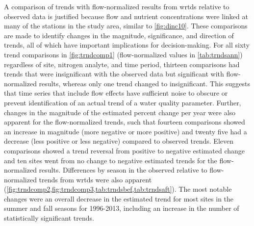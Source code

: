 \documentclass[journal = esthag, manuscript = article]{achemso}\usepackage[]{graphicx}\usepackage[]{color}
\begin{document}
A comparison of trends with flow-normalized results from \ac{wrtds} relative to observed data is justified because flow and nutrient concentrations were linked at many of the stations in the study area, similar to \cref{fig:dinc10}.  These comparisons are made to identify changes in the magnitude, significance, and direction of trends, all of which have important implications for decision-making. For all sixty trend comparisons in \cref{fig:trndcomp1} (flow-normalized values in \cref{tab:trndsann}) regardless of site, nitrogen analyte, and time period, thirteen comparisons had trends that were insignificant with the observed data but significant with flow-normalized results, whereas only one trend changed to insignificant. This suggests that time series that include flow effects have sufficient noise to obscure or prevent identification of an actual trend of a water quality parameter. Further, changes in the magnitude of the estimated percent change per year were also apparent for the flow-normalized trends, such that fourteen comparisons showed an increase in magnitude (more negative or more positive) and twenty five had a decrease (less positive or less negative) compared to observed trends.  Eleven comparisons showed a trend reversal from positive to negative estimated change and ten sites went from no change to negative estimated trends for the flow-normalized results. Differences by season in the observed relative to flow-normalized trends from \ac{wrtds} were also apparent (\cref{fig:trndcomp2,fig:trndcomp3,tab:trndsbef,tab:trndsaft}).  The most notable changes were an overall decrease in the estimated trend for most sites in the summer and fall seasons for 1996-2013, including an increase in the number of statistically significant trends.
\end{document}

